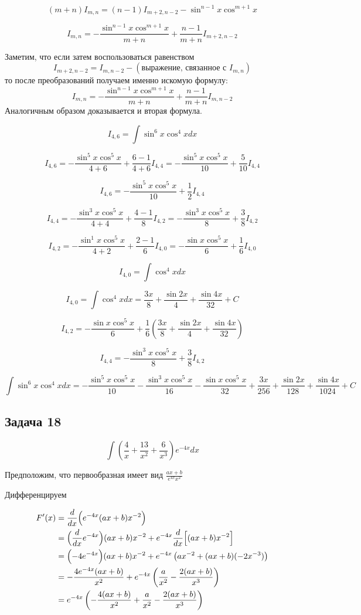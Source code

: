 \documentclass[a4paper,12pt]{article}
\begin{document}
\[
(m+n)I_{m,n}=(n-1)I_{m+2,n-2}-\sin^{n-1}x \cos^{m+1}x 
\]

\[
I_{m,n}=-\frac{\sin^{n-1}x \cos^{m+1}x}{m+n}+\frac{n-1}{m+n}I_{m+2,n-2}
\]

Заметим, что если затем воспользоваться равенством
\[
I_{m+2,n-2}=I_{m,n-2}-(\text{выражение, связанное с }I_{m,n})
\]
то после преобразований получаем именно искомую формулу:
\[
I_{m,n}=-\frac{\sin^{n-1}x \cos^{m+1}x}{m+n}+\frac{n-1}{m+n} I_{m,n-2}
\]
Аналогичным образом доказывается и вторая формула.

\[
I_{4,6}=\int \sin^6 x \cos^4 x dx 
\]

\[
I_{4,6}=-\frac{\sin^{5}x \cos^{5}x}{4+6}+\frac{6-1}{4+6} I_{4,4}
=-\frac{\sin^{5}x \cos^{5}x}{10}+\frac{5}{10} I_{4,4} 
\]

\[
I_{4,6}=-\frac{\sin^{5}x \cos^{5}x}{10}+\frac{1}{2} I_{4,4}  
\]

\[
I_{4,4}=-\frac{\sin^{3}x \cos^{5}x}{4+4}+\frac{4-1}{8} I_{4,2}
=-\frac{\sin^{3}x \cos^{5}x}{8}+\frac{3}{8} I_{4,2}  
\]

\[
I_{4,2}=-\frac{\sin^{1}x \cos^{5}x}{4+2}+\frac{2-1}{6} I_{4,0}
=-\frac{\sin x \cos^{5}x}{6}+\frac{1}{6} I_{4,0} 
\]

\[
I_{4,0}=\int \cos^4 x dx 
\]

\[
I_{4,0}=\int \cos^4 x dx
=\frac{3x}{8}+\frac{\sin2x}{4}+\frac{\sin4x}{32}+C 
\]

\[
I_{4,2}=-\frac{\sin x \cos^{5}x}{6}+\frac{1}{6}\left(\frac{3x}{8}+\frac{\sin2x}{4}+\frac{\sin4x}{32}\right)  
\]

\[
I_{4,4}=-\frac{\sin^{3}x \cos^{5}x}{8}+\frac{3}{8} I_{4,2} 
\]

\[
\int \sin^6 x \cos^4 x dx
=-\frac{\sin^{5}x \cos^{5}x}{10}
-\frac{\sin^{3}x \cos^{5}x}{16}
-\frac{\sin x \cos^{5}x}{32}
+\frac{3x}{256}+\frac{\sin2x}{128}+\frac{\sin4x}{1024}+C 
\]

\subsection{Задача 18}
\[
\int (\frac{4}{x}+\frac{13}{x^2}+\frac{6}{x^3})e^{-4x}dx
\]

Предположим, что первообразная имеет вид $\frac{ax+b}{e^{4x}x^2}$

Дифференцируем

\[
\begin{aligned}
F'(x) &= \frac{d}{dx}\Bigl(e^{-4x}(ax+b)x^{-2}\Bigr)\\
&= \Bigl(\frac{d}{dx}e^{-4x}\Bigr)(ax+b)x^{-2} + e^{-4x}  \frac{d}{dx}\Bigl[(ax+b)x^{-2}\Bigr]\\
&= \Bigl(-4e^{-4x}\Bigr)(ax+b)x^{-2} + e^{-4x}\left(a  x^{-2} + (ax+b)(-2x^{-3})\right)\\
&= -\frac{4e^{-4x}(ax+b)}{x^2} + e^{-4x}\left(\frac{a}{x^2} - \frac{2(ax+b)}{x^3}\right)\\
&= e^{-4x}\left(-\frac{4(ax+b)}{x^2} + \frac{a}{x^2} - \frac{2(ax+b)}{x^3}\right)
\end{aligned}
\]
\end{document}
